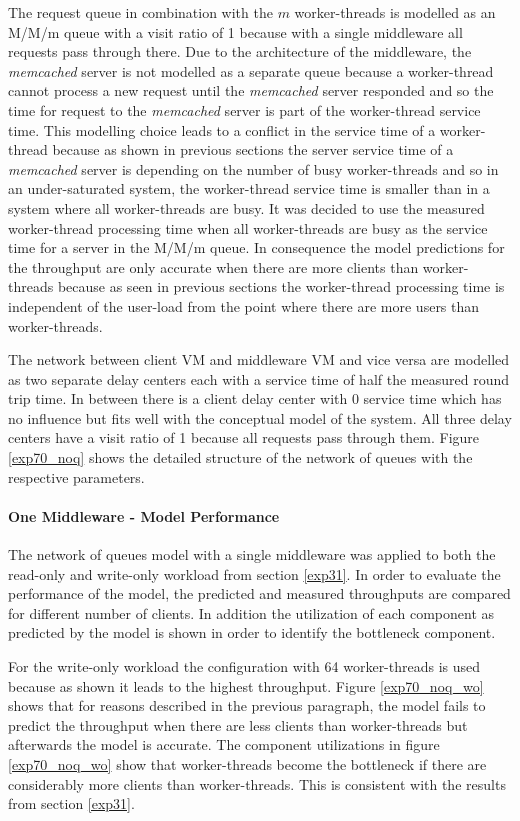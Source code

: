 \documentclass[report.tex]{subfiles}
\begin{document}
The request queue in combination with the $m$ worker-threads is modelled as an M/M/m queue with a visit ratio of 1 because with a single middleware all requests pass through there. Due to the architecture of the middleware, the \emph{memcached} server is not modelled as a separate queue because a worker-thread cannot process a new request until the \emph{memcached} server responded and so the time for request to the \emph{memcached} server is part of the worker-thread service time. This modelling choice leads to a conflict in the service time of a worker-thread because as shown in previous sections the server service time of a \emph{memcached} server is depending on the number of busy worker-threads and so in an under-saturated system, the worker-thread service time is smaller than in a system where all worker-threads are busy. 
It was decided to use the measured worker-thread processing time when all worker-threads are busy as the service time for a server in the M/M/m queue. In consequence the model predictions for the throughput are only accurate when there are more clients than worker-threads because as seen in previous sections the worker-thread processing time is independent of the user-load from the point where there are more users than worker-threads.

The network between client VM and middleware VM and vice versa are modelled as two separate delay centers each with a service time of half the measured round trip time. In between there is a client delay center with 0 service time which has no influence but fits well with the conceptual model of the system. All three delay centers have a visit ratio of 1 because all requests pass through them.
Figure \ref{exp70_noq} shows the detailed structure of the network of queues with the respective parameters.

\paragraph{One Middleware - Model Performance}
The network of queues model with a single middleware was applied to both the read-only and write-only workload from section \ref{exp31}.
In order to evaluate the performance of the model, the predicted and measured throughputs are compared for different number of clients.
In addition the utilization of each component as predicted by the model is shown in order to identify the bottleneck component.

For the write-only workload the configuration with 64 worker-threads is used because as shown it leads to the highest throughput.
Figure \ref{exp70_noq_wo} shows that for reasons described in the previous paragraph, the model fails to predict the throughput when there are less clients than worker-threads but afterwards the model is accurate. The component utilizations in figure \ref{exp70_noq_wo} show that worker-threads become the bottleneck if there are considerably more clients than worker-threads. This is consistent with the results from section \ref{exp31}.
\end{document}
